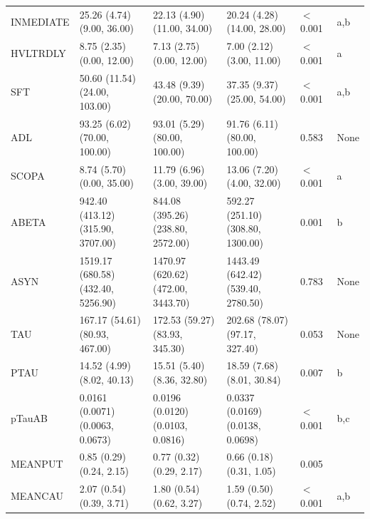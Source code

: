 \documentclass[1pt]{article}
\begin{document}
\begin{landscape}
\begin{tabular}{llllll}
	INMEDIATE &         25.26 (4.74) (9.00, 36.00) &        22.13 (4.90) (11.00, 34.00) &        20.24 (4.28) (14.00, 28.00) & $<$ 0.001 &      a,b \\
	HVLTRDLY &          8.75 (2.35) (0.00, 12.00) &          7.13 (2.75) (0.00, 12.00) &          7.00 (2.12) (3.00, 11.00) & $<$ 0.001 &        a \\
	SFT &      50.60 (11.54) (24.00, 103.00) &        43.48 (9.39) (20.00, 70.00) &        37.35 (9.37) (25.00, 54.00) & $<$ 0.001 &      a,b \\
	ADL &       93.25 (6.02) (70.00, 100.00) &       93.01 (5.29) (80.00, 100.00) &       91.76 (6.11) (80.00, 100.00) &     0.583 &     None \\
	SCOPA &          8.74 (5.70) (0.00, 35.00) &         11.79 (6.96) (3.00, 39.00) &         13.06 (7.20) (4.00, 32.00) & $<$ 0.001 &        a \\
	ABETA &  942.40 (413.12) (315.90, 3707.00) &  844.08 (395.26) (238.80, 2572.00) &  592.27 (251.10) (308.80, 1300.00) &     0.001 &        b \\
	ASYN & 1519.17 (680.58) (432.40, 5256.90) & 1470.97 (620.62) (472.00, 3443.70) & 1443.49 (642.42) (539.40, 2780.50) &     0.783 &     None \\
	TAU &     167.17 (54.61) (80.93, 467.00) &     172.53 (59.27) (83.93, 345.30) &     202.68 (78.07) (97.17, 327.40) &     0.053 &     None \\
	PTAU &         14.52 (4.99) (8.02, 40.13) &         15.51 (5.40) (8.36, 32.80) &         18.59 (7.68) (8.01, 30.84) &     0.007 &        b \\
	pTauAB &   0.0161 (0.0071) (0.0063, 0.0673) &   0.0196 (0.0120) (0.0103, 0.0816) &   0.0337 (0.0169) (0.0138, 0.0698) & $<$ 0.001 &      b,c \\
	MEANPUT &           0.85 (0.29) (0.24, 2.15) &           0.77 (0.32) (0.29, 2.17) &           0.66 (0.18) (0.31, 1.05) &     0.005 &          \\
	MEANCAU &           2.07 (0.54) (0.39, 3.71) &           1.80 (0.54) (0.62, 3.27) &           1.59 (0.50) (0.74, 2.52) & $<$ 0.001 &      a,b \\
	\bottomrule
\end{tabular}
\end{landscape}
\end{document}
